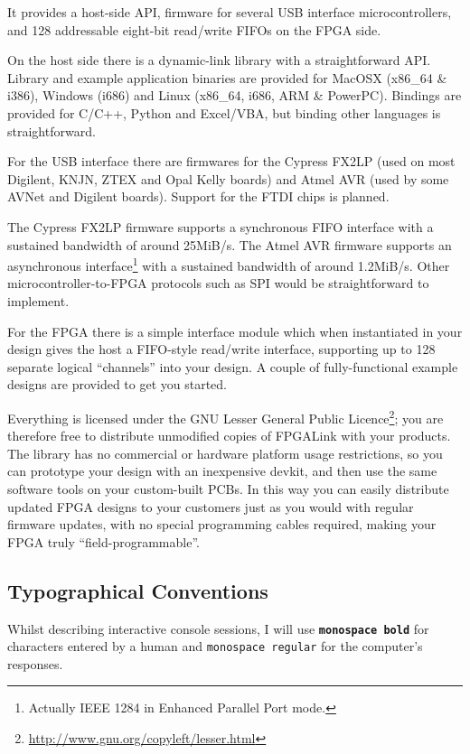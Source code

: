 It provides a host-side API, firmware for several USB interface microcontrollers, and 128 addressable eight-bit read/write FIFOs on the FPGA side.

\begin{blobs}
  \item
    On the host side there is a dynamic-link library with a straightforward API. Library and example application binaries are provided for MacOSX (x86\_64 \& i386), Windows (i686) and Linux (x86\_64, i686, ARM \& PowerPC). Bindings are provided for C/C++, Python and Excel/VBA, but binding other languages is straightforward.
  \item
    For the USB interface there are firmwares for the Cypress FX2LP (used on most Digilent, KNJN, ZTEX and Opal Kelly boards) and Atmel AVR (used by some AVNet and Digilent boards). Support for the FTDI chips is planned.
  \item
    The Cypress FX2LP firmware supports a synchronous FIFO interface with a sustained bandwidth of around 25MiB/s. The Atmel AVR firmware supports an asynchronous interface\footnote{Actually IEEE 1284 in Enhanced Parallel Port mode.} with a sustained bandwidth of around 1.2MiB/s. Other microcontroller-to-FPGA protocols such as SPI would be straightforward to implement.
  \item
    For the FPGA there is a simple interface module which when instantiated in your design gives the host a FIFO-style read/write interface, supporting up to 128 separate logical ``channels'' into your design. A couple of fully-functional example designs are provided to get you started.
\end{blobs}

Everything is licensed under the GNU Lesser General Public Licence\footnote{\url{http://www.gnu.org/copyleft/lesser.html}}; you are therefore free to distribute unmodified copies of FPGALink with your products. The library has no commercial or hardware platform usage restrictions, so you can prototype your design with an inexpensive devkit, and then use the same software tools on your custom-built PCBs. In this way you can easily distribute updated FPGA designs to your customers just as you would with regular firmware updates, with no special programming cables required, making your FPGA truly ``field-programmable''.

\subsection{Typographical Conventions}
Whilst describing interactive console sessions, I will use {\bf\textcolor[rgb]{0.00,0.00,0.00}{\texttt{monospace bold}}} for characters entered by a human and {\textcolor[rgb]{0.20,0.20,0.20}{\texttt{monospace regular}}} for the computer's responses.

